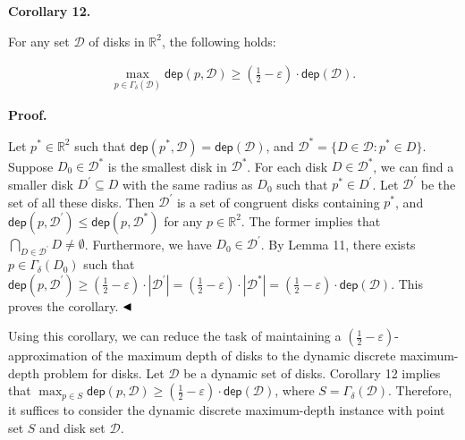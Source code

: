 \par
\par
\par\medskip\noindent\textbf{Corollary 12.}\par
For any set $\mathcal{D}$ of disks in $\mathbb{R}^{2}$, the following holds:
\par
\[\begin{aligned}
\max_{p\in\varGamma_{\delta}(\mathcal{D})}\mathsf{dep}(p,\mathcal{D})\geq\left%
(\frac{1}{2}-\varepsilon\right)\cdot\mathsf{dep}(\mathcal{D}).
\end{aligned}\]
\par
\par
\par\medskip\noindent\textbf{Proof.}\par
Let $p^{*}\in\mathbb{R}^{2}$ such that $\mathsf{dep}(p^{*},\mathcal{D})=\mathsf{dep}(\mathcal{D})$, and $\mathcal{D}^{*}=\{D\in\mathcal{D}:p^{*}\in D\}$. Suppose $D_{0}\in\mathcal{D}^{*}$ is the smallest disk in $\mathcal{D}^{*}$. For each disk $D\in\mathcal{D}^{*}$, we can find a smaller disk $D^{\prime}\subseteq D$ with the same radius as $D_{0}$ such that $p^{*}\in D^{\prime}$. Let $\mathcal{D}^{\prime}$ be the set of all these disks. Then $\mathcal{D}^{\prime}$ is a set of congruent disks containing $p^{*}$, and $\mathsf{dep}(p,\mathcal{D}^{\prime})\leq\mathsf{dep}(p,\mathcal{D}^{*})$ for any $p\in\mathbb{R}^{2}$. The former implies that $\bigcap_{D\in\mathcal{D}^{\prime}}D\neq\emptyset$. Furthermore, we have $D_{0}\in\mathcal{D}^{\prime}$. By Lemma 11, there exists $p\in\varGamma_{\delta}(D_{0})$ such that $\mathsf{dep}(p,\mathcal{D}^{\prime})\geq(\frac{1}{2}-\varepsilon)\cdot|%
\mathcal{D}^{\prime}|=(\frac{1}{2}-\varepsilon)\cdot|\mathcal{D}^{*}|=(\frac{1%
}{2}-\varepsilon)\cdot\mathsf{dep}(\mathcal{D})$. This proves the corollary. $\hfill\blacktriangleleft$
\par
\par
Using this corollary, we can reduce the task of maintaining a $(\frac{1}{2}-\varepsilon)$-approximation of the maximum depth of disks to the dynamic discrete maximum-depth problem for disks. Let $\mathcal{D}$ be a dynamic set of disks. Corollary 12 implies that $\max_{p\in S}\mathsf{dep}(p,\mathcal{D})\geq(\frac{1}{2}-\varepsilon)\cdot%
\mathsf{dep}(\mathcal{D})$, where $S=\varGamma_{\delta}(\mathcal{D})$. Therefore, it suffices to consider the dynamic discrete maximum-depth instance with point set $S$ and disk set $\mathcal{D}$.
